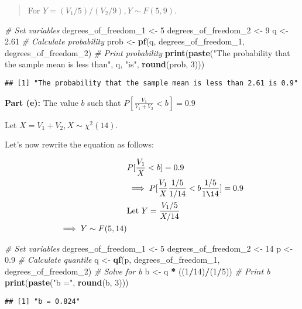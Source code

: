 \documentclass[
]{article}
\newenvironment{Shaded}{\begin{snugshade}}{\end{snugshade}}
\newcommand{\CommentTok}[1]{\textcolor[rgb]{0.56,0.35,0.01}{\textit{#1}}}
\newcommand{\DecValTok}[1]{\textcolor[rgb]{0.00,0.00,0.81}{#1}}
\newcommand{\FloatTok}[1]{\textcolor[rgb]{0.00,0.00,0.81}{#1}}
\newcommand{\FunctionTok}[1]{\textcolor[rgb]{0.13,0.29,0.53}{\textbf{#1}}}
\newcommand{\NormalTok}[1]{#1}
\newcommand{\OtherTok}[1]{\textcolor[rgb]{0.56,0.35,0.01}{#1}}
\newcommand{\SpecialCharTok}[1]{\textcolor[rgb]{0.81,0.36,0.00}{\textbf{#1}}}
\newcommand{\StringTok}[1]{\textcolor[rgb]{0.31,0.60,0.02}{#1}}
\begin{document}
\begin{quote}
For \(Y = (V_1/5)/(V_2/9), Y \sim F(5,9)\).
\end{quote}

\begin{Shaded}
\begin{Highlighting}[]
\CommentTok{\# Set variables}
\NormalTok{degrees\_of\_freedom\_1 }\OtherTok{\textless{}{-}} \DecValTok{5}
\NormalTok{degrees\_of\_freedom\_2 }\OtherTok{\textless{}{-}} \DecValTok{9}
\NormalTok{q }\OtherTok{\textless{}{-}} \FloatTok{2.61}
\CommentTok{\# Calculate probability}
\NormalTok{prob }\OtherTok{\textless{}{-}} \FunctionTok{pf}\NormalTok{(q, degrees\_of\_freedom\_1, degrees\_of\_freedom\_2)}
\CommentTok{\# Print probability}
\FunctionTok{print}\NormalTok{(}\FunctionTok{paste}\NormalTok{(}\StringTok{"The probability that the sample mean is less than"}\NormalTok{, q, }\StringTok{"is"}\NormalTok{, }\FunctionTok{round}\NormalTok{(prob, }\DecValTok{3}\NormalTok{)))}
\end{Highlighting}
\end{Shaded}

\begin{verbatim}
## [1] "The probability that the sample mean is less than 2.61 is 0.9"
\end{verbatim}

\textbf{Part (e):} The value \(b\) such that
\(P[\frac{V_1}{V_1 + V_2} < b] = 0.9\)

Let \(X = V_1 + V_2, X \sim \chi^2(14)\).

Let's now rewrite the equation as follows:

\begin{align*}
&P[\frac{V_1}{X} < b] = 0.9\\
&\implies P[\frac{V_1}{X} \frac{1/5}{1/14} < b\frac{1/5}{1\14}] = 0.9\\
&\text{Let } Y = \frac{V_1/5}{X/14}\\
\implies Y \sim F(5, 14)
\end{align*}

\begin{Shaded}
\begin{Highlighting}[]
\CommentTok{\# Set variables}
\NormalTok{degrees\_of\_freedom\_1 }\OtherTok{\textless{}{-}} \DecValTok{5}
\NormalTok{degrees\_of\_freedom\_2 }\OtherTok{\textless{}{-}} \DecValTok{14}
\NormalTok{p }\OtherTok{\textless{}{-}} \FloatTok{0.9}
\CommentTok{\# Calculate quantile}
\NormalTok{q }\OtherTok{\textless{}{-}} \FunctionTok{qf}\NormalTok{(p, degrees\_of\_freedom\_1, degrees\_of\_freedom\_2)}
\CommentTok{\# Solve for b}
\NormalTok{b }\OtherTok{\textless{}{-}}\NormalTok{ q }\SpecialCharTok{*}\NormalTok{ ((}\DecValTok{1}\SpecialCharTok{/}\DecValTok{14}\NormalTok{)}\SpecialCharTok{/}\NormalTok{(}\DecValTok{1}\SpecialCharTok{/}\DecValTok{5}\NormalTok{))}
\CommentTok{\# Print b}
\FunctionTok{print}\NormalTok{(}\FunctionTok{paste}\NormalTok{(}\StringTok{"b ="}\NormalTok{, }\FunctionTok{round}\NormalTok{(b, }\DecValTok{3}\NormalTok{)))}
\end{Highlighting}
\end{Shaded}

\begin{verbatim}
## [1] "b = 0.824"
\end{verbatim}
\end{document}
